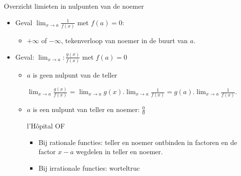 \documentclass{beamer}
\newcommand{\ds}{\displaystyle}
\begin{document}
\begin{frame}{Overzicht limieten in nulpunten van de noemer}
\begin{itemize}
	\item Geval $\displaystyle{\lim_{x \rightarrow a}} \frac{1}{f(x)}$
met $f(a) = 0$: 
\begin{itemize}
	\item[] $+ \infty$ of $- \infty$, tekenverloop van noemer in de buurt van $a$. 
\end{itemize}
\item Geval: $\displaystyle{\lim_{x \rightarrow a}}:
\frac{g(x)}{f(x)}$ met $f(a) = 0$
\begin{itemize}
	\item $a$ is geen nulpunt van de teller
	
	$\displaystyle{\lim_{x \rightarrow a}}
\frac{g(x)}{f(x)}$ = $\displaystyle{\lim_{x \rightarrow a}} g(x) .
\displaystyle{\lim_{x \rightarrow a}} \frac{1}{f(x)} = g(a) .
\displaystyle{\lim_{x \rightarrow a}} \frac{1}{f(x)}$.
\item $a$ is een nulpunt van teller en noemer: $\ds \frac00$

	 l'H\^{o}pital
	 OF 
	
	\begin{itemize}
		\item Bij rationale functies: teller en noemer
ontbinden in factoren en de factor $x-a$ wegdelen in teller en
noemer.
\item Bij irrationale functies: worteltruc
	
\end{itemize}
	
\end{itemize}
\end{itemize}

\end{frame}
\end{document}
